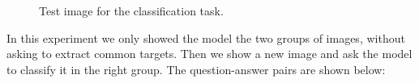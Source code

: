\begin{figure}
    \centering
    \caption[Test image]{Test image for the classification task.}
    \label{fig:test_image}
\end{figure}
In this experiment we only showed the model the two groups of images, without 
asking to extract common targets. Then we show a new image and ask the model 
to classify it in the right group. The question-answer pairs are shown below:
